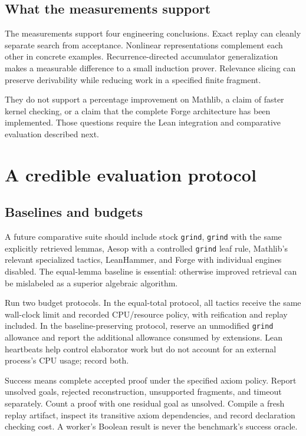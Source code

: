 \documentclass[11pt,letterpaper]{article}
\newcommand{\Lean}{\textsf{Lean}}
\newcommand{\Forge}{\textsf{Forge}}
\newcommand{\grind}{\texttt{grind}}
\theoremstyle{definition}
\theoremstyle{remark}
\begin{document}
\subsection{What the measurements support}
The measurements support four engineering conclusions. Exact replay can cleanly separate search from acceptance. Nonlinear representations complement each other in concrete examples. Recurrence-directed accumulator generalization makes a measurable difference to a small induction prover. Relevance slicing can preserve derivability while reducing work in a specified finite fragment.

They do not support a percentage improvement on Mathlib, a claim of faster kernel checking, or a claim that the complete \Forge{} architecture has been implemented. Those questions require the \Lean{} integration and comparative evaluation described next.

\section{A credible evaluation protocol}
\subsection{Baselines and budgets}
A future comparative suite should include stock \grind{}, \grind{} with the same explicitly retrieved lemmas, Aesop with a controlled \grind{} leaf rule, Mathlib's relevant specialized tactics, LeanHammer, and \Forge{} with individual engines disabled. The equal-lemma baseline is essential: otherwise improved retrieval can be mislabeled as a superior algebraic algorithm.

Run two budget protocols. In the equal-total protocol, all tactics receive the same wall-clock limit and recorded CPU/resource policy, with reification and replay included. In the baseline-preserving protocol, reserve an unmodified \grind{} allowance and report the additional allowance consumed by extensions. \Lean{} heartbeats help control elaborator work but do not account for an external process's CPU usage; record both.

Success means complete accepted proof under the specified axiom policy. Report unsolved goals, rejected reconstruction, unsupported fragments, and timeout separately. Count a proof with one residual goal as unsolved. Compile a fresh replay artifact, inspect its transitive axiom dependencies, and record declaration checking cost. A worker's Boolean result is never the benchmark's success oracle.
\end{document}
